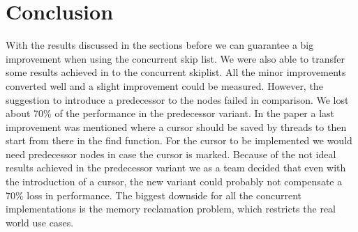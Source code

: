\documentclass{article}
\begin{document}
\section{Conclusion}
With the results discussed in the sections before we can guarantee a big improvement when using the concurrent skip list. We were also able to transfer some results achieved in \cite{improvements} to the concurrent skiplist. All the minor improvements converted well and a slight improvement could be measured. However, the suggestion to introduce a predecessor to the nodes failed in comparison. We lost about 70\% of the performance in the predecessor variant. In the paper a last improvement was mentioned where a cursor should be saved by threads to then start from there in the find function. For the cursor to be implemented we would need predecessor nodes in case the cursor is marked. Because of the not ideal results achieved in the predecessor variant we as a team decided that even with the introduction of a cursor, the new variant could probably not compensate a 70\% loss in performance. The biggest downside for all the concurrent implementations is the memory reclamation problem, which restricts the real world use cases. 

\newpage

\printbibliography
\end{document}
